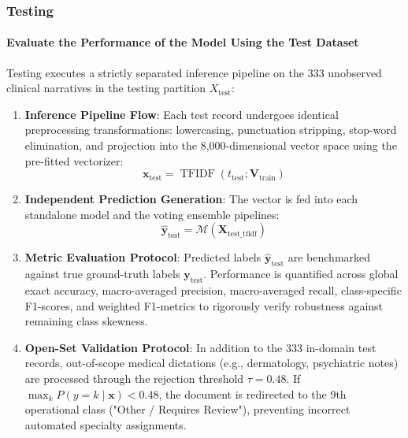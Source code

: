 \subsubsection{Testing}

\paragraph{Evaluate the Performance of the Model Using the Test Dataset}
Testing executes a strictly separated inference pipeline on the 333 unobserved clinical narratives in the testing partition $X_{\text{test}}$:

\begin{enumerate}
    \item \textbf{Inference Pipeline Flow}:
    Each test record undergoes identical preprocessing transformations: lowercasing, punctuation stripping, stop-word elimination, and projection into the 8,000-dimensional vector space using the pre-fitted vectorizer:
    \begin{equation}
        \mathbf{x}_{\text{test}} = \operatorname{TFIDF}(t_{\text{test}}; \mathbf{V}_{\text{train}})
    \end{equation}
    \item \textbf{Independent Prediction Generation}:
    The vector is fed into each standalone model and the voting ensemble pipelines:
    \begin{equation}
        \hat{\mathbf{y}}_{\text{test}} = \mathcal{M}(\mathbf{X}_{\text{test\_tfidf}})
    \end{equation}
    \item \textbf{Metric Evaluation Protocol}:
    Predicted labels $\hat{\mathbf{y}}_{\text{test}}$ are benchmarked against true ground-truth labels $\mathbf{y}_{\text{test}}$. Performance is quantified across global exact accuracy, macro-averaged precision, macro-averaged recall, class-specific F1-scores, and weighted F1-metrics to rigorously verify robustness against remaining class skewness.
    \item \textbf{Open-Set Validation Protocol}:
    In addition to the 333 in-domain test records, out-of-scope medical dictations (e.g., dermatology, psychiatric notes) are processed through the rejection threshold $\tau = 0.48$. If $\max_k P(y=k \mid \mathbf{x}) < 0.48$, the document is redirected to the 9th operational class ("Other / Requires Review"), preventing incorrect automated specialty assignments.
\end{enumerate}
